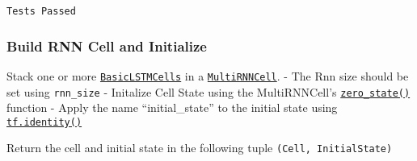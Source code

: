 \documentclass[11pt]{article}
\begin{document}
    \begin{Verbatim}[commandchars=\\\{\}]
Tests Passed

    \end{Verbatim}

    \hypertarget{build-rnn-cell-and-initialize}{%
\subsubsection{Build RNN Cell and
Initialize}\label{build-rnn-cell-and-initialize}}

Stack one or more
\href{https://www.tensorflow.org/api_docs/python/tf/contrib/rnn/BasicLSTMCell}{\texttt{BasicLSTMCells}}
in a
\href{https://www.tensorflow.org/api_docs/python/tf/contrib/rnn/MultiRNNCell}{\texttt{MultiRNNCell}}.
- The Rnn size should be set using \texttt{rnn\_size} - Initalize Cell
State using the MultiRNNCell's
\href{https://www.tensorflow.org/api_docs/python/tf/contrib/rnn/MultiRNNCell\#zero_state}{\texttt{zero\_state()}}
function - Apply the name ``initial\_state'' to the initial state using
\href{https://www.tensorflow.org/api_docs/python/tf/identity}{\texttt{tf.identity()}}

Return the cell and initial state in the following tuple
\texttt{(Cell,\ InitialState)}
\end{document}
